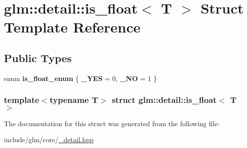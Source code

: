 \hypertarget{structglm_1_1detail_1_1is__float}{\section{glm\-:\-:detail\-:\-:is\-\_\-float$<$ \-T $>$ \-Struct \-Template \-Reference}
\label{structglm_1_1detail_1_1is__float}
}
\subsection*{\-Public \-Types}
\begin{DoxyCompactItemize}
\item 
enum {\bfseries is\-\_\-float\-\_\-enum} \{ {\bfseries \-\_\-\-Y\-E\-S} =  0, 
{\bfseries \-\_\-\-N\-O} =  1
 \}
\end{DoxyCompactItemize}
\subsubsection*{template$<$typename \-T$>$ struct glm\-::detail\-::is\-\_\-float$<$ T $>$}



\-The documentation for this struct was generated from the following file\-:\begin{DoxyCompactItemize}
\item 
include/glm/core/\hyperlink{__detail_8hpp}{\-\_\-detail.\-hpp}\end{DoxyCompactItemize}
